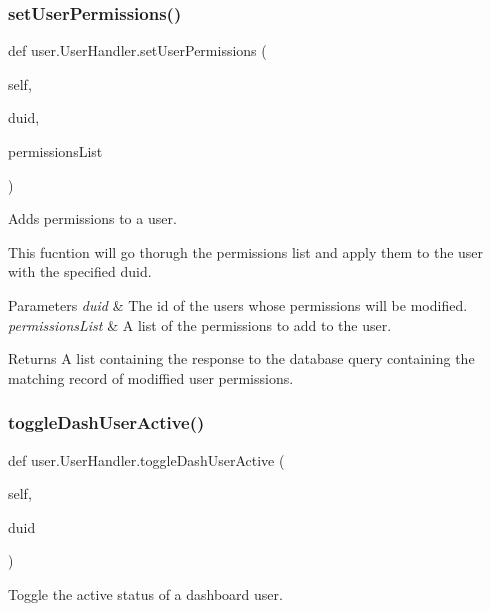 \subsubsection{\texorpdfstring{set\+User\+Permissions()}{setUserPermissions()}}
{\footnotesize\ttfamily def user.\+User\+Handler.\+set\+User\+Permissions (\begin{DoxyParamCaption}\item[{}]{self,  }\item[{}]{duid,  }\item[{}]{permissions\+List }\end{DoxyParamCaption})}



Adds permissions to a user. 

This fucntion will go thorugh the permissions list and apply them to the user with the specified duid.


\begin{DoxyParams}{Parameters}
{\em duid} & The id of the user\textquotesingle{}s whose permissions will be modified. \\
\hline
{\em permissions\+List} & A list of the permissions to add to the user.\\
\hline
\end{DoxyParams}
\begin{DoxyReturn}{Returns}
A list containing the response to the database query containing the matching record of modiffied user permissions. 
\end{DoxyReturn}
\mbox{\label{classuser_1_1_user_handler_abbd281b19b1cb06e98de34ef756d9a17}} 
\subsubsection{\texorpdfstring{toggle\+Dash\+User\+Active()}{toggleDashUserActive()}}
{\footnotesize\ttfamily def user.\+User\+Handler.\+toggle\+Dash\+User\+Active (\begin{DoxyParamCaption}\item[{}]{self,  }\item[{}]{duid }\end{DoxyParamCaption})}



Toggle the active status of a dashboard user. 

